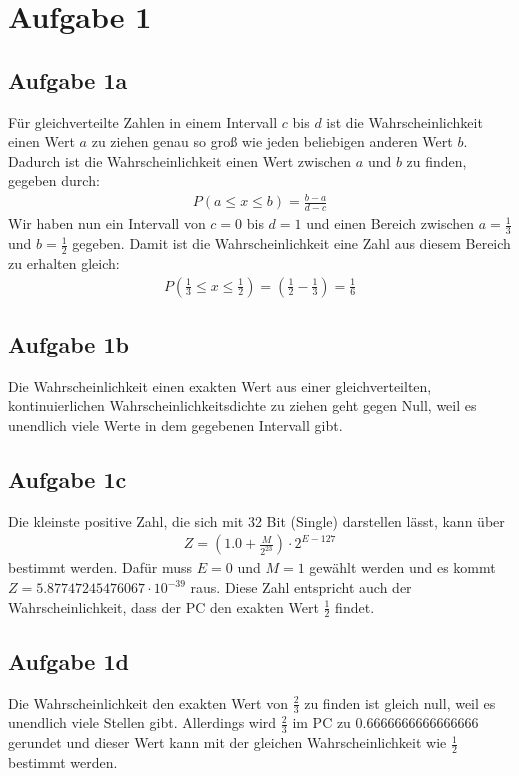 \section*{Aufgabe 1}
\subsection*{Aufgabe 1a}
Für gleichverteilte Zahlen in einem Intervall $c$ bis $d$ ist die Wahrscheinlichkeit einen Wert $a$ zu ziehen genau so groß wie jeden beliebigen anderen Wert $b$. Dadurch ist die Wahrscheinlichkeit einen Wert zwischen $a$ und $b$ zu finden, gegeben durch:
\begin{align*}
  P(a \le x\le b) = \frac{b - a}{d - c}
\end{align*}
Wir haben nun ein Intervall von $c = 0$ bis $d = 1$ und einen Bereich zwischen $a = \frac{1}{3}$ und $b = \frac{1}{2}$ gegeben. Damit ist die Wahrscheinlichkeit eine Zahl aus diesem Bereich zu erhalten gleich:
\begin{align*}
  P\left(\frac{1}{3}\le x\le\frac{1}{2} \right) = \left(\frac{1}{2} - \frac{1}{3}\right) = \frac{1}{6}
\end{align*}

\subsection*{Aufgabe 1b}
Die Wahrscheinlichkeit einen exakten Wert aus einer gleichverteilten, kontinuierlichen Wahrscheinlichkeitsdichte zu ziehen geht gegen Null, weil es unendlich viele Werte in dem gegebenen Intervall gibt.

\subsection*{Aufgabe 1c}
Die kleinste positive Zahl, die sich mit 32 Bit (Single) darstellen lässt, kann über
\begin{align*}
  Z = \left(1.0 + \frac{M}{2^{23}}\right)\cdot 2^{E-127}
\end{align*}
bestimmt werden. Dafür muss $E = 0$ und $M = 1$ gewählt werden und es kommt $Z = 5.87747245476067 \cdot 10^{-39}$ raus. Diese Zahl entspricht auch der Wahrscheinlichkeit, dass der PC den exakten Wert $\frac{1}{2}$ findet.

\subsection*{Aufgabe 1d}
Die Wahrscheinlichkeit den exakten Wert von $\frac{2}{3}$ zu finden ist gleich null, weil es unendlich viele Stellen gibt. Allerdings wird $\frac{2}{3}$ im PC zu 0.6666666666666666 gerundet und dieser Wert kann mit der gleichen Wahrscheinlichkeit wie $\frac{1}{2}$ bestimmt werden.

